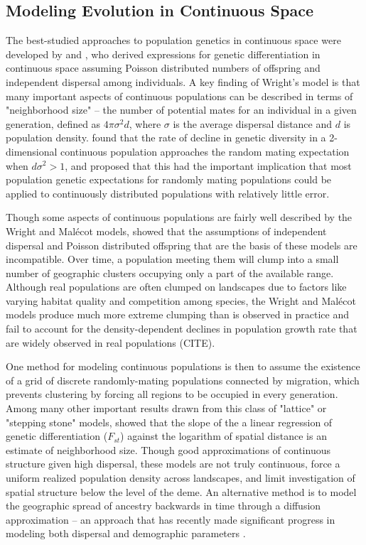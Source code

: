 \documentclass[9pt,twocolumn,twoside,lineno]{gsajnl}
\begin{document}
\subsection{Modeling Evolution in Continuous Space}
The best-studied approaches to population genetics in continuous space were developed by \cite{Wright1943} and \cite{Malecot1948}, who derived expressions for genetic differentiation in continuous space assuming Poisson distributed numbers of offspring and independent dispersal among individuals. A key finding of Wright's model is that many important aspects of continuous populations can be described in terms of "neighborhood size" -- the number of potential mates for an individual in a given generation, defined as $4\pi\sigma^2d$, where $\sigma$ is the average dispersal distance and $d$ is population density. \cite{Maruyama1972} found that the rate of decline in genetic diversity in a 2-dimensional continuous population approaches the random mating expectation when $d\sigma^2 > 1$, and proposed that this had the important implication that most population genetic expectations for randomly mating populations could be applied to continuously distributed populations with relatively little error. 

Though some aspects of continuous populations are fairly well described by the Wright and Malécot models, \cite{Felsenstein1975} showed that the assumptions of independent dispersal and Poisson distributed offspring that are the basis of these models are incompatible. Over time, a population meeting them will clump into a small number of geographic clusters occupying only a part of the available range. Although real populations are often clumped on landscapes due to factors like varying habitat quality and competition among species, the Wright and Malécot models produce much more extreme clumping than is observed in practice and fail to account for the density-dependent declines in population growth rate that are widely observed in real populations (CITE). 

One method for modeling continuous populations is then to assume the existence of a grid of discrete randomly-mating populations connected by migration, which prevents clustering by forcing all regions to be occupied in every generation. Among many other important results drawn from this class of "lattice" or "stepping stone" models, \cite{Rousset1997} showed that the slope of the a linear regression of genetic differentiation ($F_{st}$) against the logarithm of spatial distance is an estimate of neighborhood size. Though good approximations of continuous structure given high dispersal, these models are not truly continuous, force a uniform realized population density across landscapes, and limit investigation of spatial structure below the level of the deme. An alternative method is to model the geographic spread of ancestry backwards in time through a diffusion approximation -- an approach that has recently made significant progress in modeling both dispersal and demographic parameters \citep{Barton2010,Kelleher2014,Ringbauer2017,Ringbauer2018}.
\end{document}
